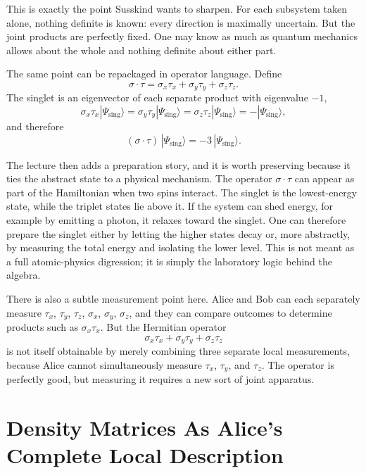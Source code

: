 This is exactly the point Susskind wants to sharpen. For each subsystem taken alone, nothing definite is known: every direction is maximally uncertain. But the joint products are perfectly fixed. One may know as much as quantum mechanics allows about the whole and nothing definite about either part.

The same point can be repackaged in operator language. Define
\begin{equation}
\sigma\!\cdot\!\tau
=
\sigma_x\tau_x+\sigma_y\tau_y+\sigma_z\tau_z.
\end{equation}
The singlet is an eigenvector of each separate product with eigenvalue $-1$,
\begin{equation}
\sigma_x\tau_x|\Psi_{\mathrm{sing}}\rangle
=
\sigma_y\tau_y|\Psi_{\mathrm{sing}}\rangle
=
\sigma_z\tau_z|\Psi_{\mathrm{sing}}\rangle
=
-|\Psi_{\mathrm{sing}}\rangle,
\end{equation}
and therefore
\begin{equation}
(\sigma\!\cdot\!\tau)\,|\Psi_{\mathrm{sing}}\rangle
=
-3\,|\Psi_{\mathrm{sing}}\rangle.
\end{equation}

The lecture then adds a preparation story, and it is worth preserving because it ties the abstract state to a physical mechanism. The operator $\sigma\!\cdot\!\tau$ can appear as part of the Hamiltonian when two spins interact. The singlet is the lowest-energy state, while the triplet states lie above it. If the system can shed energy, for example by emitting a photon, it relaxes toward the singlet. One can therefore prepare the singlet either by letting the higher states decay or, more abstractly, by measuring the total energy and isolating the lower level. This is not meant as a full atomic-physics digression; it is simply the laboratory logic behind the algebra.

There is also a subtle measurement point here. Alice and Bob can each separately measure $\tau_x$, $\tau_y$, $\tau_z$, $\sigma_x$, $\sigma_y$, $\sigma_z$, and they can compare outcomes to determine products such as $\sigma_x\tau_x$. But the Hermitian operator
\[
\sigma_x\tau_x+\sigma_y\tau_y+\sigma_z\tau_z
\]
is not itself obtainable by merely combining three separate local measurements, because Alice cannot simultaneously measure $\tau_x$, $\tau_y$, and $\tau_z$. The operator is perfectly good, but measuring it requires a new sort of joint apparatus.

\section{Density Matrices As Alice's Complete Local Description}

